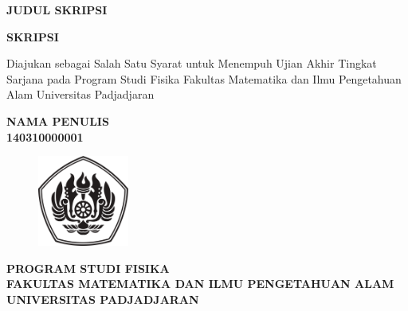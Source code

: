 \begin{titlepage}
    \thispagestyle{empty}
    \begin{center}
        \begin{large}\begin{spacing}{1}
                \textbf{JUDUL SKRIPSI}
            \end{spacing}\end{large}

        \vspace{4cm}
        \textbf{SKRIPSI}

        \vspace{1cm}
        Diajukan sebagai Salah Satu Syarat untuk Menempuh Ujian Akhir Tingkat Sarjana pada Program Studi Fisika Fakultas Matematika dan Ilmu Pengetahuan Alam Universitas Padjadjaran

        \vspace{1cm}
        \textbf{NAMA PENULIS\\
            140310000001}

        \vspace{2cm}
        \begin{figure}[h]
            \centering
            \includegraphics[width=3cm]{assets/pics/university-logo.pdf}
            \label{fig:universitylogo}
        \end{figure}

        \vspace{2cm}
        \textbf{PROGRAM STUDI FISIKA\\
            FAKULTAS MATEMATIKA DAN ILMU PENGETAHUAN ALAM\\
            UNIVERSITAS PADJADJARAN\\}

        \vspace{\baselineskip}
        \textbf{\large \the\year{}}
    \end{center}
\end{titlepage}